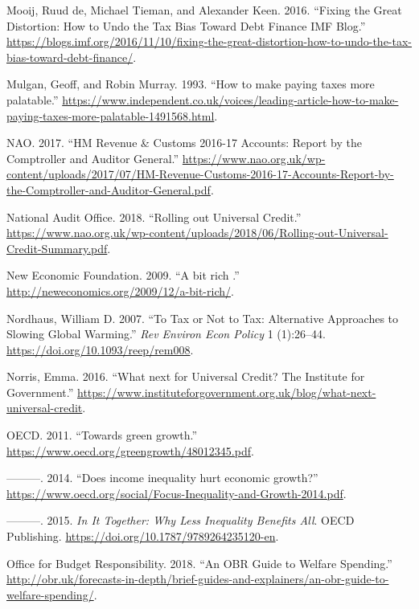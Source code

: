 \documentclass[]{tufte-handout}
\begin{document}
\leavevmode\hypertarget{ref-DeMooij2016}{}%
Mooij, Ruud de, Michael Tieman, and Alexander Keen. 2016. ``Fixing the
Great Distortion: How to Undo the Tax Bias Toward Debt Finance
\textbar{} IMF Blog.''
\url{https://blogs.imf.org/2016/11/10/fixing-the-great-distortion-how-to-undo-the-tax-bias-toward-debt-finance/}.

\leavevmode\hypertarget{ref-Mulgan1993}{}%
Mulgan, Geoff, and Robin Murray. 1993. ``How to make paying taxes more
palatable.''
\url{https://www.independent.co.uk/voices/leading-article-how-to-make-paying-taxes-more-palatable-1491568.html}.

\leavevmode\hypertarget{ref-NAO2017}{}%
NAO. 2017. ``HM Revenue \& Customs 2016-17 Accounts: Report by the
Comptroller and Auditor General.''
\url{https://www.nao.org.uk/wp-content/uploads/2017/07/HM-Revenue-Customs-2016-17-Accounts-Report-by-the-Comptroller-and-Auditor-General.pdf}.

\leavevmode\hypertarget{ref-NationalAuditOffice2018}{}%
National Audit Office. 2018. ``Rolling out Universal Credit.''
\url{https://www.nao.org.uk/wp-content/uploads/2018/06/Rolling-out-Universal-Credit-Summary.pdf}.

\leavevmode\hypertarget{ref-NewEconomicFoundation2009}{}%
New Economic Foundation. 2009. ``A bit rich \textbar{}.''
\url{http://neweconomics.org/2009/12/a-bit-rich/}.

\leavevmode\hypertarget{ref-Nordhaus2007}{}%
Nordhaus, William D. 2007. ``To Tax or Not to Tax: Alternative
Approaches to Slowing Global Warming.'' \emph{Rev Environ Econ Policy} 1
(1):26--44. \url{https://doi.org/10.1093/reep/rem008}.

\leavevmode\hypertarget{ref-Norris2016}{}%
Norris, Emma. 2016. ``What next for Universal Credit? \textbar{} The
Institute for Government.''
\url{https://www.instituteforgovernment.org.uk/blog/what-next-universal-credit}.

\leavevmode\hypertarget{ref-OECD2011}{}%
OECD. 2011. ``Towards green growth.''
\url{https://www.oecd.org/greengrowth/48012345.pdf}.

\leavevmode\hypertarget{ref-OE2014}{}%
---------. 2014. ``Does income inequality hurt economic growth?''
\url{https://www.oecd.org/social/Focus-Inequality-and-Growth-2014.pdf}.

\leavevmode\hypertarget{ref-OECD2015}{}%
---------. 2015. \emph{In It Together: Why Less Inequality Benefits
All}. OECD Publishing. \url{https://doi.org/10.1787/9789264235120-en}.

\leavevmode\hypertarget{ref-OBR2018}{}%
Office for Budget Responsibility. 2018. ``An OBR Guide to Welfare
Spending.''
\url{http://obr.uk/forecasts-in-depth/brief-guides-and-explainers/an-obr-guide-to-welfare-spending/}.
\end{document}
